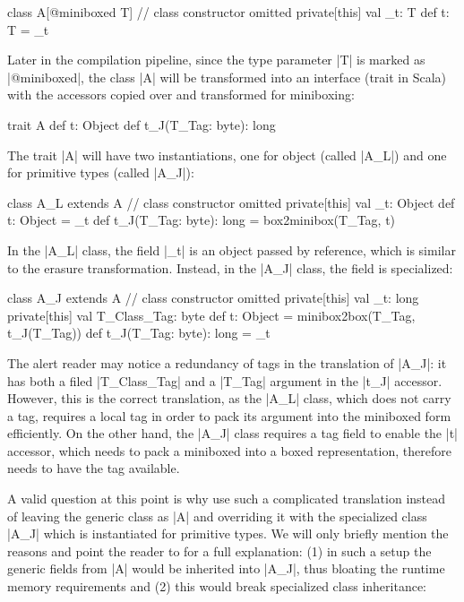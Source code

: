 \begin{lstlisting-nobreak}
 class A[@miniboxed T]{
   // class constructor omitted
   private[this] val _t: T
   def t: T = _t
 }
\end{lstlisting-nobreak}

Later in the compilation pipeline, since the type parameter |T| is marked as |@miniboxed|, the class |A| will be transformed into an interface (trait in Scala) with the accessors copied over and transformed for miniboxing:

\begin{lstlisting-nobreak}
 trait A {
   def t: Object
   def t_J(T_Tag: byte): long
 }
\end{lstlisting-nobreak}

The trait |A| will have two instantiations, one for object (called |A_L|) and one for primitive types (called |A_J|):

\begin{lstlisting-nobreak}
 class A_L extends A {
   // class constructor omitted
   private[this] val _t: Object
   def t: Object = _t
   def t_J(T_Tag: byte): long = box2minibox(T_Tag, t)
 }
\end{lstlisting-nobreak}

In the |A_L| class, the field |_t| is an object passed by reference, which is similar to the erasure transformation. Instead, in the |A_J| class, the field is specialized:

\begin{lstlisting-nobreak}
 class A_J extends A {
   // class constructor omitted
   private[this] val _t: long
   private[this] val T_Class_Tag: byte
   def t: Object = minibox2box(T_Tag, t_J(T_Tag))
   def t_J(T_Tag: byte): long = _t
 }
\end{lstlisting-nobreak}

The alert reader may notice a redundancy of tags in the translation of |A_J|: it has both a filed |T_Class_Tag| and a |T_Tag| argument in the |t_J| accessor. However, this is the correct translation, as the |A_L| class, which does not carry a tag, requires a local tag in order to pack its argument into the miniboxed form efficiently. On the other hand, the |A_J| class requires a tag field to enable the |t| accessor, which needs to pack a miniboxed into a boxed representation, therefore needs to have the tag available.

A valid question at this point is why use such a complicated translation instead of leaving the generic class as |A| and overriding it with the specialized class |A_J| which is instantiated for primitive types. We will only briefly mention the reasons and point the reader to \cite{miniboxing} for a full explanation: (1) in such a setup the generic fields from |A| would be inherited into |A_J|, thus bloating the runtime memory requirements and (2) this would break specialized class inheritance:

